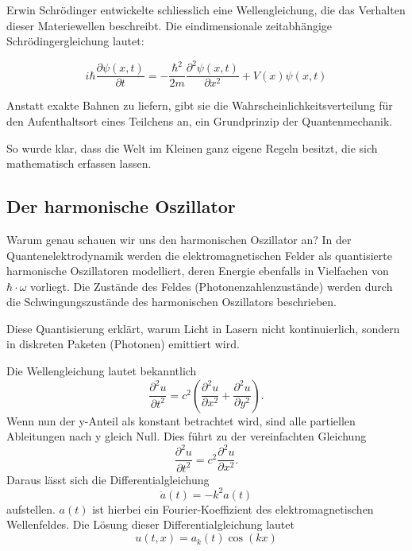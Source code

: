 	
	Erwin Schrödinger entwickelte schliesslich eine Wellengleichung, die das Verhalten dieser Materiewellen beschreibt. Die eindimensionale zeitabhängige Schrödingergleichung lautet:
	
	
	\begin{equation}
		i \hbar \frac{\partial \psi(x,t)}{\partial t} = -\frac{\hbar^2}{2m} \frac{\partial^2 \psi(x,t)}{\partial x^2} + V(x) \psi(x,t)
	\end{equation}
	
	
	Anstatt exakte Bahnen zu liefern, gibt sie die Wahrscheinlichkeitsverteilung für den Aufenthaltsort eines Teilchens an, ein Grundprinzip der Quantenmechanik.
	
	So wurde klar, dass die Welt im Kleinen ganz eigene Regeln besitzt, die sich mathematisch erfassen lassen.
	
	
	

\subsection{Der harmonische Oszillator
\label{fourier:subsection:derHarmonischeOszillator}}
Warum genau schauen wir uns den harmonischen Oszillator an?
In der Quantenelektrodynamik werden die elektromagnetischen Felder als quantisierte harmonische Oszillatoren modelliert, deren Energie ebenfalls in Vielfachen von $\hbar\cdot\omega$ vorliegt.
Die Zustände des Feldes (Photonenzahlenzustände) werden durch die Schwingungszustände des harmonischen Oszillators beschrieben.

Diese Quantisierung erklärt, warum Licht in Lasern nicht kontinuierlich, sondern in diskreten Paketen (Photonen) emittiert wird. %

Die Wellengleichung lautet bekanntlich
\begin{equation}
    \frac{\partial^2 u}{\partial t^2} = c^2 \left( \frac{\partial^2 u}{\partial x^2} + \frac{\partial^2 u}{\partial y^2} \right).
\end{equation}
Wenn nun der y-Anteil als konstant betrachtet wird, sind alle partiellen Ableitungen nach y gleich Null.
Dies führt zu der vereinfachten Gleichung
\begin{equation}
    \frac{\partial^2 u}{\partial t^2} = c^2 \frac{\partial^2 u}{\partial x^2}.
\end{equation}
Daraus lässt sich die Differentialgleichung
\begin{equation}
    \ddot{a}(t) = -k^2 a(t)
\end{equation}
aufstellen.
$a(t)$ ist hierbei ein Fourier-Koeffizient des elektromagnetischen Wellenfeldes.
Die Lösung dieser Differentialgleichung lautet
\begin{equation}
    u(t,x) = a_k(t) \cos(kx)
\end{equation}


